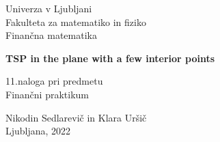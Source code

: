 \documentclass[a4paper, 11pt]{article}
\begin{document}
\begin{titlepage}
    \begin{center}
        \Large
        Univerza v Ljubljani\\
        Fakulteta za matematiko in fiziko\\
        Finančna matematika\\

        \vspace*{6cm}
        
        \Huge
        \textbf{TSP in the plane with a few interior points}

        \vspace*{3cm}

        \Large
        11.naloga pri predmetu\\
        Finančni praktikum

        \vspace*{5cm}

        \Large
        Nikodin Sedlarevič in Klara Uršič\\
        Ljubljana, 2022
    \end{center}
\end{titlepage}
\end{document}
